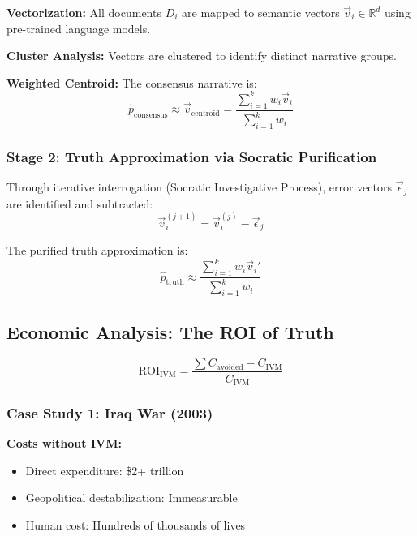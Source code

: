 \documentclass[11pt,a4paper]{article}
\theoremstyle{definition}
\theoremstyle{remark}
\newcommand{\RR}{\mathbb{R}}
\begin{document}
\textbf{Vectorization:} All documents $D_i$ are mapped to semantic vectors $\vec{v}_i \in \RR^d$ using pre-trained language models.

\textbf{Cluster Analysis:} Vectors are clustered to identify distinct narrative groups.

\textbf{Weighted Centroid:} The consensus narrative is:
\begin{equation}
\hat{p}_{\text{consensus}} \approx \vec{v}_{\text{centroid}} = \frac{\sum_{i=1}^{k} w_i \vec{v}_i}{\sum_{i=1}^{k} w_i}
\end{equation}

\subsubsection{Stage 2: Truth Approximation via Socratic Purification}

Through iterative interrogation (Socratic Investigative Process), error vectors $\vec{\epsilon}_j$ are identified and subtracted:
\begin{equation}
\vec{v}_i^{(j+1)} = \vec{v}_i^{(j)} - \vec{\epsilon}_j
\end{equation}

The purified truth approximation is:
\begin{equation}
\hat{p}_{\text{truth}} \approx \frac{\sum_{i=1}^{k} w_i \vec{v}_i'}{\sum_{i=1}^{k} w_i}
\end{equation}

\subsection{Economic Analysis: The ROI of Truth}

\begin{equation}
\text{ROI}_{\text{IVM}} = \frac{\sum C_{\text{avoided}} - C_{\text{IVM}}}{C_{\text{IVM}}}
\end{equation}

\subsubsection{Case Study 1: Iraq War (2003)}

\textbf{Costs without IVM:}
\begin{itemize}
\item Direct expenditure: \$2+ trillion
\item Geopolitical destabilization: Immeasurable
\item Human cost: Hundreds of thousands of lives
\end{itemize}
\end{document}
